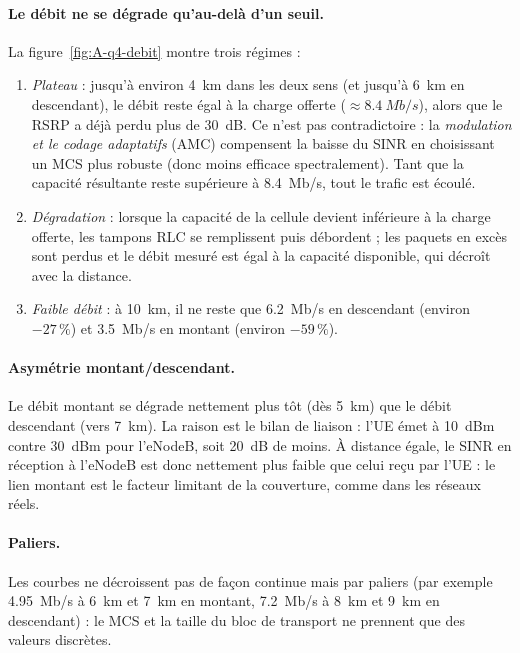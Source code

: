 \paragraph{Le débit ne se dégrade qu'au-delà d'un seuil.} La
figure~\ref{fig:A-q4-debit} montre trois régimes :
\begin{enumerate}[nosep]
\item \emph{Plateau} : jusqu'à environ \SI{4}{km} dans les deux sens (et
jusqu'à \SI{6}{km} en descendant), le débit reste égal à la charge offerte
($\approx\SI{8.4}{Mb/s}$), alors que le RSRP a déjà perdu plus de \SI{30}{dB}.
Ce n'est pas contradictoire : la \emph{modulation et le codage adaptatifs}
(AMC) compensent la baisse du SINR en choisissant un MCS plus robuste (donc moins
efficace spectralement). Tant que la capacité résultante reste supérieure à
\SI{8.4}{Mb/s}, tout le trafic est écoulé.
\item \emph{Dégradation} : lorsque la capacité de la cellule devient inférieure
à la charge offerte, les tampons RLC se remplissent puis débordent ; les
paquets en excès sont perdus et le débit mesuré est égal à la capacité
disponible, qui décroît avec la distance.
\item \emph{Faible débit} : à \SI{10}{km}, il ne reste que \SI{6.2}{Mb/s} en
descendant (environ $-27\,\%$) et \SI{3.5}{Mb/s} en montant (environ
$-59\,\%$).
\end{enumerate}

\paragraph{Asymétrie montant/descendant.} Le débit montant se dégrade
nettement plus tôt (dès \SI{5}{km}) que le débit descendant (vers \SI{7}{km}).
La raison est le bilan de liaison : l'UE émet à \SI{10}{dBm} contre \SI{30}{dBm}
pour l'eNodeB, soit \SI{20}{dB} de moins. À distance égale, le SINR en réception
à l'eNodeB est donc nettement plus faible que celui reçu par l'UE : le lien
montant est le facteur limitant de la couverture, comme dans les réseaux réels.

\paragraph{Paliers.} Les courbes ne décroissent pas de façon continue mais par
paliers (par exemple \SI{4.95}{Mb/s} à \SI{6}{km} et \SI{7}{km} en montant,
\SI{7.2}{Mb/s} à \SI{8}{km} et \SI{9}{km} en descendant) : le MCS et la taille
du bloc de transport ne prennent que des valeurs discrètes.

